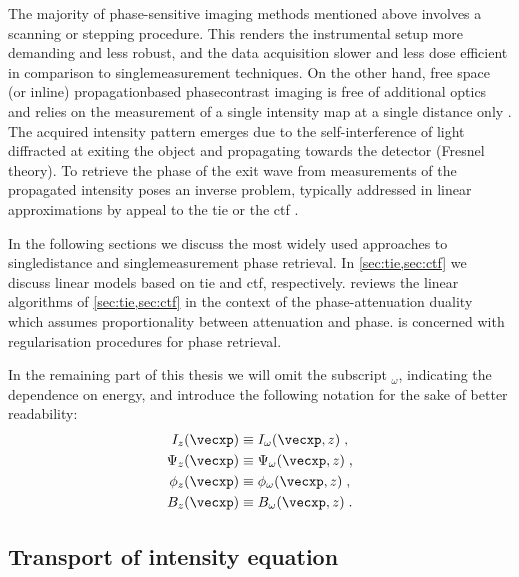 \documentclass[
twoside,
openright,
titlepage,
numbers=noenddot,
headinclude,
fleqn,
a4paper,
footinclude=true,
cleardoublepage=empty,
abstractoff,
BCOR=5mm,
paper=a4,
fontsize=11pt,
british,ngerman,american,
]{scrreprt}
\begin{document}
The majority of phase-sensitive imaging methods mentioned above
involves a scanning or stepping procedure.  This renders the
instrumental setup more demanding and less robust, and the data
acquisition slower and less dose efficient in comparison to
single\hyph measurement techniques.  On the other hand, free\hyph
space (or in\hyph line) propagation\hyph based phase\hyph contrast
imaging is free of additional optics and relies on the measurement of
a single intensity map at a single distance only
\cite{Snigirev1995,Wilkins1996}.  The acquired intensity pattern
emerges due to the self-interference of light diffracted at exiting
the object and propagating towards the detector (Fresnel theory).  To
retrieve the phase of the exit wave from measurements of the
propagated intensity poses an inverse problem, typically addressed in
linear approximations by appeal to the \acf{tie} \cite{Teague1982,
  Teague1983, Gureyev1995, Gureyev1996, Paganin1998, Gureyev2004,
  Nugent2005} or the \acf{ctf} \cite{Turner2004, Gureyev2006OptCommun,
  Gureyev2006apl}.

In the following sections we discuss the most widely used approaches
to single\hyph distance and single\hyph measurement phase retrieval.
In \cref{sec:tie,sec:ctf} we discuss linear models based on \ac{tie}
and \ac{ctf}, respectively.   reviews the linear
algorithms of \cref{sec:tie,sec:ctf} in the context of the
phase-attenuation duality which assumes proportionality between
attenuation and phase.   is concerned with
regularisation procedures for phase retrieval.

In the remaining part of this thesis we will omit the subscript
$_\omega$, indicating the dependence on energy, and introduce the
following notation for the sake of better readability:
\begin{equation}
  \label{eq:abbreviations}
  \begin{split}
       I_z(\vecxp) & \equiv I_\omega(\vecxp,z) \;,
       \\ \Psi_z(\vecxp) & \equiv \Psi_\omega(\vecxp,z) \;,
       \\ \phi_z(\vecxp) & \equiv \phi_\omega(\vecxp,z) \;,
       \\ B_z(\vecxp) & \equiv B_\omega(\vecxp,z) \;.
  \end{split}
\end{equation}


\subsection{Transport of intensity equation}
\label{sec:tie}
\end{document}
